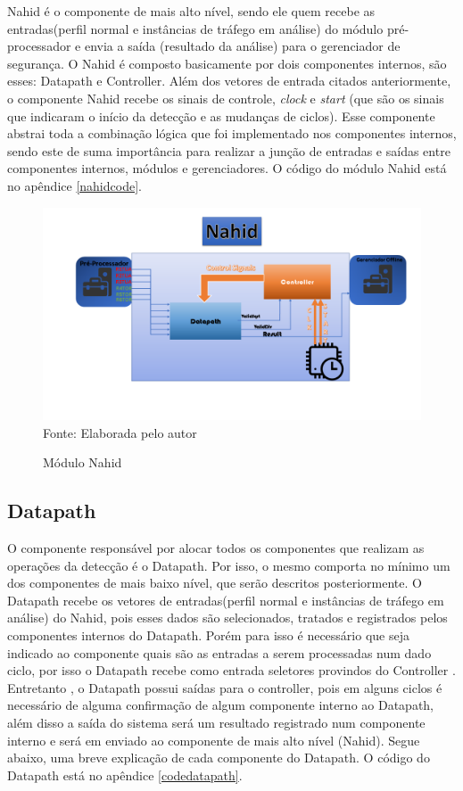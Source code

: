 Nahid é o componente de mais alto nível, sendo ele quem recebe as entradas(perfil normal e instâncias de tráfego em análise) do módulo pré-processador e envia a saída (resultado da análise) para o gerenciador de segurança. O Nahid é composto basicamente por dois componentes  internos, são esses: Datapath e Controller.  Além dos vetores de entrada citados anteriormente, o componente  Nahid recebe os sinais de controle, \textit{clock} e \textit{start} (que são os sinais que indicaram o início da detecção e as mudanças de ciclos). Esse componente  abstrai toda a combinação lógica que foi implementado nos componentes  internos, sendo este de suma importância para realizar a junção de entradas e saídas entre componentes internos, módulos e  gerenciadores. O código do módulo Nahid está no apêndice \ref{nahidcode}.
\begin{figure}[H]
	\label{ops}
	\centering
		\caption{Módulo Nahid}
	\includegraphics[width=12cm]{figures/NahidModule.png}\\
	{Fonte: Elaborada pelo autor}
\end{figure}

\subsection{Datapath}

O componente responsável por alocar todos os componentes que realizam as operações da detecção  é o Datapath. Por isso, o mesmo comporta no mínimo um dos componentes de mais baixo nível, que serão descritos posteriormente. O Datapath recebe os vetores de entradas(perfil normal e instâncias de tráfego em análise) do Nahid, pois esses dados são selecionados, tratados e registrados pelos componentes internos do Datapath. Porém para isso é necessário que seja indicado ao componente quais são as entradas a serem processadas num dado ciclo, por isso o Datapath recebe como entrada seletores provindos do Controller . Entretanto , o Datapath possui saídas para o controller, pois em alguns ciclos é necessário de alguma confirmação de algum componente  interno ao Datapath, além disso a saída do sistema será um resultado registrado num componente interno e será em enviado ao componente de mais alto nível (Nahid). Segue abaixo, uma breve explicação de cada componente do Datapath. O código do Datapath está no apêndice \ref{codedatapath}.


